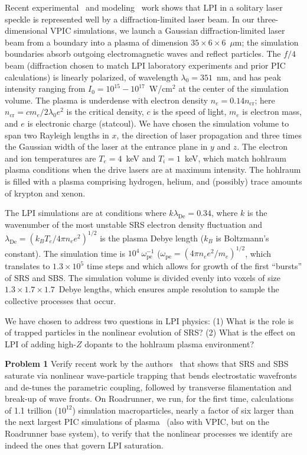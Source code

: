 \documentclass[10pt]{article}
\newcommand{\lde}      {\lambda_{\mathrm{De}}}
\newcommand{\wpe}      {\omega_{\mathrm{pe}}}
\begin{document}
Recent experimental~\cite{Kline_PRL_2005} and
modeling~\cite{Yin_et_al_PRL_2007_SRS} work shows that LPI in a
solitary laser speckle is represented well by a diffraction-limited
laser beam.  In our three-dimensional VPIC simulations, we launch a
Gaussian diffraction-limited laser beam from a boundary into a plasma
of dimension $35 \times 6 \times 6$~$\mu$m; the simulation boundaries
absorb outgoing electromagnetic waves and reflect particles.  The
$f/4$ beam (diffraction chosen to match LPI laboratory experiments and
prior PIC calculations) is linearly polarized, of wavelength
$\lambda_0 = 351$~nm, and has peak intensity ranging from $I_0 =
10^{15} - 10^{17}$~W/cm$^2$ at the center of the simulation volume.
The plasma is underdense with electron density $n_e = 0.14
n_{\mathrm{cr}}$; here $n_{\mathrm{cr}} = c m_e / 2 \lambda_0 e^2$ is
the critical density, $c$ is the speed of light, $m_e$ is electron
mass, and $e$ is electronic charge (statcoul).  We have chosen the
simulation volume to span two Rayleigh lengths in $x$, the direction
of laser propagation and three times the Gaussian width of the laser
at the entrance plane in $y$ and $z$.  The electron and ion
temperatures are $T_e = 4$~keV and $T_i = 1$~keV, which match hohlraum
plasma conditions when the drive lasers are at maximum intensity.  The
hohlraum is filled with a plasma comprising hydrogen, helium, and
(possibly) trace amounts of krypton and xenon.

The LPI simulations are at conditions where $k \lde = 0.34$, where $k$
is the wavenumber of the most unstable SRS electron density
fluctuation and $\lde = (k_B T_e / 4 \pi n_e e^2)^{1/2}$ is the plasma
Debye length ($k_B$ is Boltzmann's constant).  The simulation time is
$10^4~\wpe^{-1}$ ($\wpe = (4 \pi n_e e^2 / m_e)^{1/2}$, which
translates to $1.3 \times 10^5$ time steps and which allows for growth
of the first ``bursts'' of SRS and SBS.  The simulation volume is
divided evenly into voxels of size $1.3 \times 1.7 \times 1.7$~Debye
lengths, which ensures ample resolution to sample the collective
processes that occur.

We have chosen to address two questions in LPI physics: (1) What is
the role is of trapped particles in the nonlinear evolution of SRS?
(2) What is the effect on LPI of adding high-$Z$ dopants to the
hohlraum plasma environment?

\textbf{Problem 1}
Verify recent work by the
authors~\cite{Yin_et_al_PRL_2007_SRS,Yin_et_al_Phys_Plasmas_2007_SRS}
that shows that SRS and SBS saturate via nonlinear wave-particle
trapping that bends electrostatic wavefronts and de-tunes the
parametric coupling, followed by transverse filamentation and break-up
of wave fronts.  On Roadrunner, we run, for the first time,
calculations of 1.1 trillion ($10^{12}$) simulation macroparticles,
nearly a factor of six larger than the next largest PIC simulations of
plasma~\cite{Yin_et_al_PRL_2007_reconnection} (also with VPIC, but on
the Roadrunner base system), to verify that the nonlinear processes we
identify are indeed the ones that govern LPI saturation.
\end{document}
